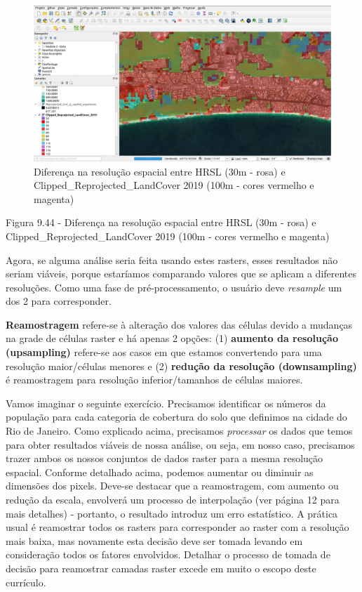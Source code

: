 \documentclass[
]{krantz}
\begin{document}
\begin{figure}
\centering
\includegraphics{media/modulo9/fig944.png}
\caption{Diferença na resolução espacial entre HRSL (30m - rosa) e Clipped\_Reprojected\_LandCover 2019 (100m - cores vermelho e magenta)}
\end{figure}

Figura 9.44 - Diferença na resolução espacial entre HRSL (30m - rosa) e Clipped\_Reprojected\_LandCover 2019 (100m - cores vermelho e magenta)

Agora, se alguma análise seria feita usando estes rasters, esses resultados não seriam viáveis, porque estaríamos comparando valores que se aplicam a diferentes resoluções. Como uma fase de pré-processamento, o usuário deve \emph{resample} um dos 2 para corresponder.

\textbf{Reamostragem} refere-se à alteração dos valores das células devido a mudanças na grade de células raster e há apenas 2 opções: (1) \textbf{aumento da resolução (upsampling)} refere-se aos casos em que estamos convertendo para uma resolução maior/células menores e (2) \textbf{redução da resolução (downsampling)} é reamostragem para resolução inferior/tamanhos de células maiores.

Vamos imaginar o seguinte exercício. Precisamos identificar os números da população para cada categoria de cobertura do solo que definimos na cidade do Rio de Janeiro. Como explicado acima, precisamos \emph{processar} os dados que temos para obter resultados viáveis \hspace{0pt}\hspace{0pt}de nossa análise, ou seja, em nosso caso, precisamos trazer ambos os nossos conjuntos de dados raster para a mesma resolução espacial. Conforme detalhado acima, podemos aumentar ou diminuir as dimensões dos pixels. Deve-se destacar que a reamostragem, com aumento ou redução da escala, envolverá um processo de interpolação (ver página 12 para mais detalhes) - portanto, o resultado introduz um erro estatístico. A prática usual é reamostrar todos os rasters para corresponder ao raster com a resolução mais baixa, mas novamente esta decisão deve ser tomada levando em consideração todos os fatores envolvidos. Detalhar o processo de tomada de decisão para reamostrar camadas raster excede em muito o escopo deste currículo.
\end{document}
